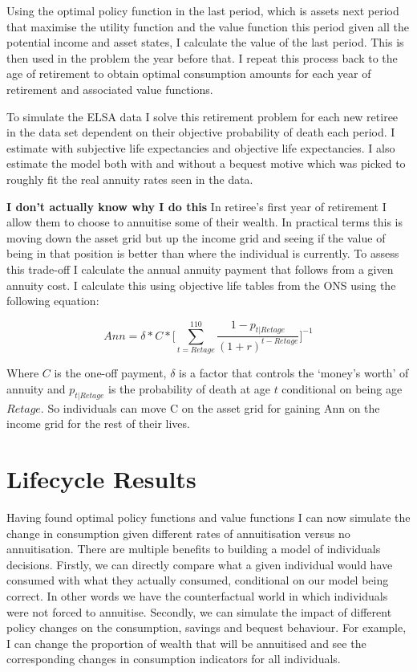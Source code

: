 \documentclass[12pt]{article}
\begin{document}
Using the optimal policy function in the last period, which is assets next period that maximise the utility
function and the value function this period given all the potential income and asset states, I calculate the value of the last period.
This is then used in the problem the year before that.
I repeat this process back to the age of retirement to obtain optimal consumption amounts for each year of retirement
and associated value functions.

To simulate the ELSA data I solve this retirement problem for each new retiree in the data set dependent on their
objective probability of death each period. I estimate with subjective life expectancies and objective life expectancies.
I also estimate the model both with and without a bequest motive which was picked to roughly fit the real annuity
rates seen in the data.

\textbf{I don't actually know why I do this}
In retiree's first year of retirement I allow them to choose to annuitise some of their wealth. In practical terms
this is moving down the asset grid but up the income grid and seeing if the value of being in that position is better
than where the individual is currently. To assess this trade-off I calculate the annual annuity payment that follows
from a given annuity cost. I calculate this using objective life tables from the ONS using the following equation:

\begin{equation*}
    Ann = \delta * C * \biggl[\sum_{t = Retage}^{110}\frac{1 - p_{t|Retage}}{(1 + r)^{t - Retage}}\biggr]^{-1}
\end{equation*}

Where $C$ is the one-off payment, $\delta$ is a factor that controls the `money's worth' of annuity and $p_{t|Retage}$
is the probability of death at age $t$ conditional on being age $Retage$. So individuals can move C on the asset grid
for gaining Ann on the income grid for the rest of their lives.


\section{Lifecycle Results}

Having found optimal policy functions and value functions I can now simulate the change in consumption given
different rates of annuitisation versus no annuitisation.
There are multiple benefits to building a model of individuals decisions. Firstly, we can directly compare
what a given individual would have consumed with what they actually consumed, conditional on our model being
correct. In other words we have the counterfactual world in which individuals were not forced to annuitise.
Secondly, we can simulate the impact of different policy changes on the consumption, savings and bequest behaviour.
For example, I can change the proportion of wealth that will be annuitised and see the corresponding changes in
consumption indicators for all individuals.
\end{document}
